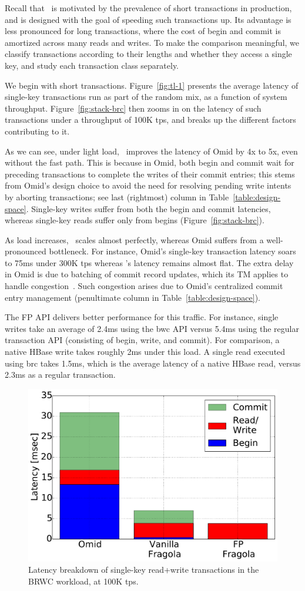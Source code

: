 Recall that \sys\ is motivated by the prevalence of short transactions in production, and is designed with
the goal of speeding such transactions up.
Its advantage is less pronounced for long transactions, where the cost of begin and commit is amortized
across many reads and writes.
To make the comparison meaningful, we classify transactions according to their lengths and whether they
access a single key, and study each transaction class separately. 

We begin with short transactions. 
Figure~\ref{fig:tl-1} presents the average latency of single-key transactions run as part of the random mix,
as a function of {system} throughput.
Figure~\ref{fig:stack-brc}  then zooms in on the latency of such transactions under 
a throughput of 100K tps, and breaks up the different factors contributing to it. 

As we can see, under light load, \sys\ improves the latency of Omid by 4x to 5x, even without the fast path.
This is because in Omid, both begin and commit wait for preceding transactions to complete the writes of 
their commit entries; this stems from Omid's design choice to avoid the need for resolving pending write intents
by aborting transactions; see last (rightmost) column in Table~\ref{table:design-space}. 
Single-key writes suffer from both the begin and commit latencies, whereas single-key reads  
suffer only from begins (Figure~\ref{fig:stack-brc}). 

As load increases, \sys\ scales almost perfectly, whereas Omid suffers from a well-pronounced 
bottleneck. For instance, Omid's single-key transaction latency soars to 75ms under 300K tps whereas
{\sys}'s latency remains almost flat. The extra delay in Omid is due to batching of commit record updates, 
which its TM applies to handle congestion~\cite{Omid2017}. Such congestion arises due to Omid's centralized 
commit entry management (penultimate column in Table~\ref{table:design-space}).

The FP API delivers better performance for this traffic. For instance, single writes take an average of 2.4ms using 
the {\code bwc} API versus 5.4ms using the regular transaction API (consisting of begin, write, and commit). 
For comparison, a native HBase write takes roughly 2ms under this load.
A single read executed using {\code brc} takes 1.5ms, which is the average latency of a native HBase read,
versus 2.3ms as a regular transaction. 

\begin{figure}[htb]
\centering
\includegraphics[width=.45\textwidth]{figs/latency_rwm.pdf}
\caption{Latency breakdown of single-key read+write transactions in the BRWC workload,
at 100K tps.}
\label{fig:rmw}
\end{figure}

